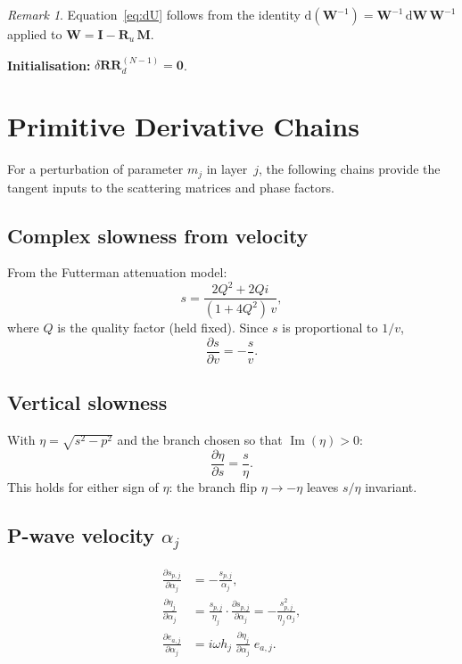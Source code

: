 \documentclass[11pt,a4paper]{article}
\newcommand{\dRR}{\delta\mathbf{RR}}
\newcommand{\Ru}{\mathbf{R}_u}
\newcommand{\vM}{\mathbf{M}}
\newcommand{\vI}{\mathbf{I}}
\newcommand{\vW}{\mathbf{W}}
\newcommand{\dd}{\mathrm{d}}
\newcommand{\ppd}[2]{\frac{\partial #1}{\partial #2}}
\theoremstyle{plain}
\theoremstyle{remark}
\newtheorem{remark}{Remark}
\begin{document}
\begin{remark}
Equation~\eqref{eq:dU} follows from the identity
$\dd(\vW^{-1}) = \vW^{-1}\,\dd\vW\,\vW^{-1}$
applied to $\vW = \vI - \Ru\,\vM$.
\end{remark}

\noindent\textbf{Initialisation:}
$\dRR_d^{(N-1)} = \mathbf{0}$.

\section{Primitive Derivative Chains}\label{sec:primitives}

For a perturbation of parameter $m_j$ in layer~$j$, the following chains
provide the tangent inputs to the scattering matrices and phase factors.

\subsection{Complex slowness from velocity}

From the Futterman attenuation model:
\begin{equation}\label{eq:slowness}
  s = \frac{2Q^2 + 2Qi}{(1+4Q^2)\,v},
\end{equation}
where $Q$ is the quality factor (held fixed).  Since $s$ is proportional to
$1/v$,
\begin{equation}\label{eq:dsdv}
  \boxed{\ppd{s}{v} = -\frac{s}{v}.}
\end{equation}

\subsection{Vertical slowness}

With $\eta = \sqrt{s^2 - p^2}$ and the branch chosen so that
$\operatorname{Im}(\eta) > 0$:
\begin{equation}\label{eq:detads}
  \ppd{\eta}{s} = \frac{s}{\eta}.
\end{equation}
This holds for either sign of $\eta$: the branch flip $\eta\to -\eta$ leaves
$s/\eta$ invariant.

\subsection{P-wave velocity $\alpha_j$}

\begin{align}
  \ppd{s_{p,j}}{\alpha_j} &= -\frac{s_{p,j}}{\alpha_j},
  \label{eq:dsp}\\[4pt]
  \ppd{\eta_j}{\alpha_j}
    &= \frac{s_{p,j}}{\eta_j}\cdot\ppd{s_{p,j}}{\alpha_j}
     = -\frac{s_{p,j}^2}{\eta_j\,\alpha_j},
  \label{eq:deta-alpha}\\[4pt]
  \ppd{e_{a,j}}{\alpha_j}
    &= i\omega h_j\;\ppd{\eta_j}{\alpha_j}\;e_{a,j}.
  \label{eq:dea-alpha}
\end{align}
\end{document}
